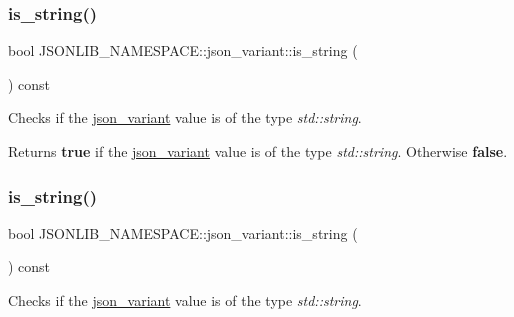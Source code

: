 \subsubsection{\texorpdfstring{is\+\_\+string()}{is\_string()}\hspace{0.1cm}{\footnotesize\ttfamily [1/2]}}
{\footnotesize\ttfamily bool J\+S\+O\+N\+L\+I\+B\+\_\+\+N\+A\+M\+E\+S\+P\+A\+C\+E\+::json\+\_\+variant\+::is\+\_\+string (\begin{DoxyParamCaption}{ }\end{DoxyParamCaption}) const}



Checks if the \hyperlink{classJSONLIB__NAMESPACE_1_1json__variant}{json\+\_\+variant} value is of the type {\itshape std\+::string}. 

\begin{DoxyReturn}{Returns}
{\bfseries true} if the \hyperlink{classJSONLIB__NAMESPACE_1_1json__variant}{json\+\_\+variant} value is of the type {\itshape std\+::string}. Otherwise {\bfseries false}. 
\end{DoxyReturn}
\mbox{\label{classJSONLIB__NAMESPACE_1_1json__variant_ae097a22fe419dd083ff07bfebf0e8151}} 
\subsubsection{\texorpdfstring{is\+\_\+string()}{is\_string()}\hspace{0.1cm}{\footnotesize\ttfamily [2/2]}}
{\footnotesize\ttfamily bool J\+S\+O\+N\+L\+I\+B\+\_\+\+N\+A\+M\+E\+S\+P\+A\+C\+E\+::json\+\_\+variant\+::is\+\_\+string (\begin{DoxyParamCaption}{ }\end{DoxyParamCaption}) const}



Checks if the \hyperlink{classJSONLIB__NAMESPACE_1_1json__variant}{json\+\_\+variant} value is of the type {\itshape std\+::string}. 

